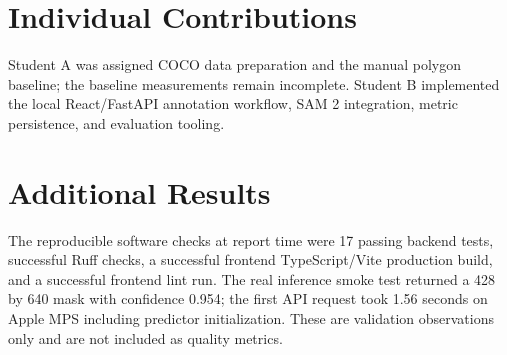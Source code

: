 \documentclass[11pt]{article}
\begin{document}
\section*{Individual Contributions}
\label{sec:contributions}
Student A was assigned COCO data preparation and the manual polygon baseline;
the baseline measurements remain incomplete. Student B implemented the local
React/FastAPI annotation workflow, SAM 2 integration, metric persistence, and
evaluation tooling.




\appendix
\section{Additional Results}
\label{sec:appendix}
The reproducible software checks at report time were 17 passing backend tests,
successful Ruff checks, a successful frontend TypeScript/Vite production
build, and a successful frontend lint run. The real inference smoke test
returned a 428 by 640 mask with confidence 0.954; the first API request took
1.56 seconds on Apple MPS including predictor initialization. These are
validation observations only and are not included as quality metrics.
\end{document}
